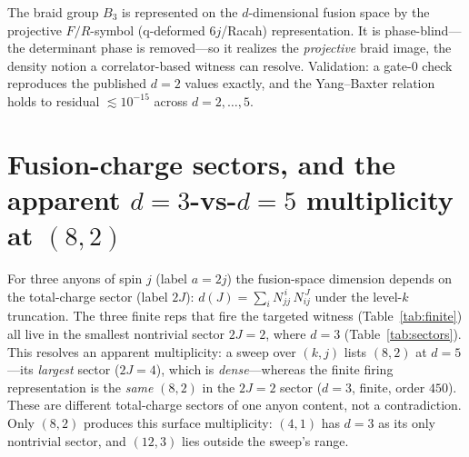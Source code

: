 \documentclass[aps,prx,reprint,amsmath,amssymb,floatfix,nofootinbib,superscriptaddress]{revtex4-2}
\begin{document}
The braid group $B_3$ is represented on the $d$-dimensional fusion space by the
projective $F/R$-symbol (q-deformed $6j$/Racah) representation. It is phase-blind---the
determinant phase is removed---so it realizes the \emph{projective} braid image, the
density notion a correlator-based witness can resolve. Validation: a gate-$0$ check
reproduces the published $d=2$ values exactly, and the Yang--Baxter relation holds to
residual $\lesssim 10^{-15}$ across $d = 2,\ldots,5$.

\section{Fusion-charge sectors, and the apparent $d=3$-vs-$d=5$ multiplicity at $(8,2)$}
\label{app:sectors}

For three anyons of spin $j$ (label $a = 2j$) the fusion-space dimension depends on
the total-charge sector (label $2J$): $d(J) = \sum_i N_{jj}^{\,i}\, N_{ij}^{\,J}$
under the level-$k$ truncation. The three finite reps that fire the targeted witness
(Table~\ref{tab:finite}) all live in the smallest nontrivial sector $2J = 2$, where
$d = 3$ (Table~\ref{tab:sectors}). This resolves an apparent multiplicity: a sweep
over $(k,j)$ lists $(8,2)$ at $d=5$---its \emph{largest} sector ($2J=4$), which is
\emph{dense}---whereas the finite firing representation is the \emph{same} $(8,2)$ in
the $2J=2$ sector ($d=3$, finite, order $450$). These are different total-charge
sectors of one anyon content, not a contradiction. Only $(8,2)$ produces this surface
multiplicity: $(4,1)$ has $d=3$ as its only nontrivial sector, and $(12,3)$ lies
outside the sweep's range.

\begin{table}[b]
\caption{Fusion-space dimension by total-charge sector $\{2J : d\}$ for the three
finite families, and the finite $d=3$ representation each contributes at $2J=2$.}
\label{tab:sectors}
\centering
{}
\end{table}
\end{document}
